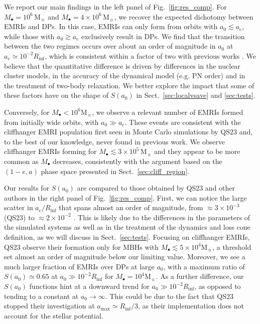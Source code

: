 \documentclass[desactivate]{aa}
\begin{document}
        We report our main findings in the left panel of Fig.\ \ref{fig:res_comp}.
        For $M_\bullet = 10^6 \, \mathrm{M}_\sun$ and $M_\bullet = 4 \times 10^6 \, \mathrm{M}_\sun$, we recover the expected dichotomy between EMRIs and DPs. In this case, EMRIs can only form from orbits with $a_0 \lesssim a_\mathrm{c}$, while those with $a_0 \gtrsim a_\mathrm{c}$ exclusively result in DPs. We find that the transition between the two regimes occurs over about an order of magnitude in $a_0$ at $a_\mathrm{c} \simeq 10^{-2} R_\mathrm{inf}$, which is consistent within a factor of two with previous works \citep{2005ApJ...629..362H,2021MNRAS.501.5012R,2023arXiv230413062Q}. We believe that the quantitative difference is driven by differences in the nuclear cluster models, in the accuracy of the dynamical model (e.g. PN order) and in the treatment of two-body relaxation. We better explore the impact that some of these factors have on the shape of $S(a_0)$ in Sect.\ \ref{sec:localvsave} and \ref{sec:tests}.

        Conversely, for $M_\bullet < 10^6 \mathrm{M}_\sun$, we observe a relevant number of EMRIs formed from initially wide orbits, with $a_0 \gg a_\mathrm{c}$. These events are consistent with the cliffhanger EMRI population first seen in Monte Carlo simulations by QS23 and, to the best of our knowledge, never found in previous work.
        We observe cliffhanger EMRIs forming for $M_\bullet \lesssim 3 \times 10^5 \, \mathrm{M}_\sun$ and they appear to be more common as $M_\bullet$ decreases, consistently with the argument based on the $(1-e,a)$ phase space presented in Sect.\ \ref{sec:cliff_region}. 
        
        Our results for $S(a_0)$ are compared to those obtained by  QS23 and other authors in the right panel of Fig.\ \ref{fig:res_comp}.
        First, we can notice the large scatter in $a_\mathrm{c}/R_\mathrm{inf}$ that spans almost an order of magnitude, from $\approx 3\times10^{-3}$ (QS23) to $\approx 2\times10^{-2}$ \citep{2021MNRAS.501.5012R}. This is likely due to the differences in the parameters of the simulated systems as well as in the treatment of the dynamics and loss cone definition, as we will discuss in Sect.\ \ref{sec:tests}. Focusing on cliffhanger EMRIs,
        QS23 observe their formation only for MBHs with $M_\bullet \lesssim 5 \times 10^4 \mathrm{M}_\sun$, a threshold set almost an order of magnitude below our limiting value. Moreover, we see a much larger fraction of EMRIs over DPs at large $a_0$, with a maximum ratio of $S(a_0) \simeq 0.65$ at $a_0 \gg 10^{-2} R_\mathrm{inf}$ for $M_\bullet = 10^4 \mathrm{M}_\sun$. As a further difference, our $S(a_0)$ functions hint at a downward trend for $a_0 \gg 10^{-2} R_\mathrm{inf}$, as opposed to tending to a constant at $a_0 \to \infty$. This could be due to the fact that QS23 stopped their investigation at $a_\mathrm{max} \simeq R_\mathrm{inf}/3$, as their implementation does not account for the stellar potential.
        
\end{document}
